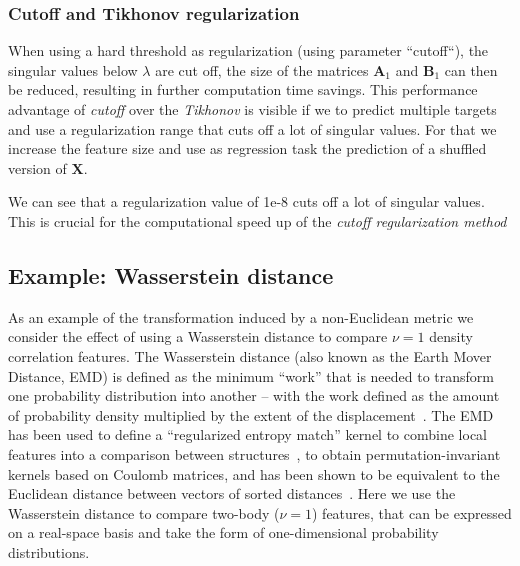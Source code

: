 \subsubsection{Cutoff and Tikhonov regularization}
When using a hard threshold as regularization (using parameter ``cutoff``),
the singular values below $\lambda$ are cut off, the size of the
matrices $\mathbf{A}_1$ and $\mathbf{B}_1$ can then be reduced,
resulting in further computation time savings.  This performance advantage of
\emph{cutoff} over the \emph{Tikhonov} is visible if we to predict multiple targets
and use a regularization range that cuts off a lot of singular values. For
that we increase the feature size and use as regression task the prediction
of a shuffled version of $\mathbf{X}$.


We can see that a regularization value of 1e-8 cuts off a lot of singular
values. This is crucial for the computational speed up of the
\emph{cutoff regularization method}

\subsection{Example: Wasserstein distance}
As an example of the transformation induced by a non-Euclidean metric we consider the effect of using a Wasserstein distance to compare $\nu=1$ density correlation features. 
The Wasserstein distance (also known as the Earth Mover Distance, EMD) is defined as the minimum  ``work'' that is needed to transform one probability distribution into another -- with the work defined as the amount of probability density multiplied by the extent of the displacement~\cite{vall74siam,cohe-guib97report,cutu07proc}.
The EMD has been used to define a ``regularized entropy match'' kernel to combine local features into a comparison between structures~\cite{de+16pccp}, to obtain permutation-invariant kernels based on Coulomb matrices\cite{ccaylak2020wasserstein}, and  has been shown to be equivalent to the Euclidean distance between vectors of sorted distances~\cite{will+19jcp}.
Here we use the Wasserstein distance to compare two-body ($\nu=1$) features, that can be expressed on a real-space basis and take the form of one-dimensional probability distributions. 

